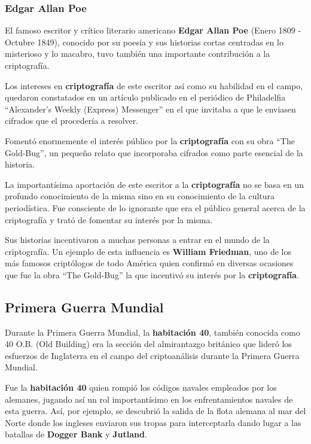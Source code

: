 \documentclass[nochap]{apuntesURJC}
\begin{document}
\subsubsection{Edgar Allan Poe}
El famoso escritor y crítico literario americano \textbf{Edgar Allan Poe} (Enero 1809 - Octubre 1849), conocido por su poesía y sus historias cortas centradas en lo misterioso y lo macabro, tuvo también una importante contribución a la criptografía.

Los intereses en \textbf{criptografía} de este escritor así como su habilidad en el campo, quedaron constatados en un artículo publicado en el periódico de Philadelfia ``Alexander's Weekly (Express) Messenger'' en el que invitaba a que le enviasen cifrados que el procedería a resolver.

Fomentó enormemente el interés público por la \textbf{criptografía} con su obra ``The Gold-Bug'', un pequeño relato que incorporaba cifrados como parte esencial de la historia.

La importantísima aportación de este escritor a la \textbf{criptografía} no se basa en un profundo conocimiento de la misma sino en su conocimiento de la cultura periodística. Fue consciente de lo ignorante que era el público general acerca de la criptografía y trató de fomentar su interés por la misma.

Sus historias incentivaron a muchas personas a entrar en el mundo de la criptografía. Un ejemplo de esta influencia es \textbf{William Friedman}, uno de los más famosos criptólogos de todo América quien confirmó en diversas ocasiones que fue la obra ``The Gold-Bug'' la que incentivó su interés por la \textbf{criptografía}.

\subsection{Primera Guerra Mundial}
Durante la Primera Guerra Mundial, la \textbf{habitación 40}, también conocida como 40 O.B. (Old Building) era la sección del almirantazgo británico que lideró los esfuerzos de Inglaterra en el campo del criptoanálisis durante la Primera Guerra Mundial.

Fue la \textbf{habitación 40} quien rompió los códigos navales empleados por los alemanes, jugando así un rol importantísimo en los enfrentamientos navales de esta guerra. Así, por ejemplo, se descubrió la salida de la flota alemana al mar del Norte donde los ingleses enviaron sus tropas para interceptarla dando lugar a las batallas de \textbf{Dogger Bank} y \textbf{Jutland}.
\end{document}
